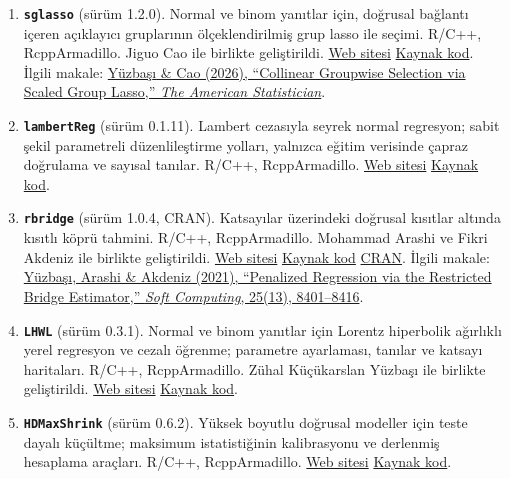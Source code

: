 \documentclass[10pt,a4paper]{article}
\newenvironment{etaremune}{\begin{enumerate}}{\end{enumerate}}
\begin{document}
\begin{etaremune}
\item \textbf{\texttt{sglasso}} (sürüm 1.2.0). Normal ve binom yanıtlar için, doğrusal bağlantı içeren açıklayıcı gruplarının ölçeklendirilmiş grup lasso ile seçimi. R/C++, RcppArmadillo. Jiguo Cao ile birlikte geliştirildi. \href{https://byuzbasi.github.io/sglasso/}{Web sitesi} \textbar{} \href{https://github.com/byuzbasi/sglasso}{Kaynak kod}. İlgili makale: \href{https://doi.org/10.1080/00031305.2026.2709494}{Y\"{u}zba\c{s}{\i} \& Cao (2026), ``Collinear Groupwise Selection via Scaled Group Lasso,'' \textit{The American Statistician}}.

\item \textbf{\texttt{lambertReg}} (sürüm 0.1.11). Lambert cezasıyla seyrek normal regresyon; sabit şekil parametreli düzenlileştirme yolları, yalnızca eğitim verisinde çapraz doğrulama ve sayısal tanılar. R/C++, RcppArmadillo. \href{https://byuzbasi.github.io/lambertReg/}{Web sitesi} \textbar{} \href{https://github.com/byuzbasi/lambertReg}{Kaynak kod}.

\item \textbf{\texttt{rbridge}} (sürüm 1.0.4, CRAN). Katsayılar üzerindeki doğrusal kısıtlar altında kısıtlı köprü tahmini. R/C++, RcppArmadillo. Mohammad Arashi ve Fikri Akdeniz ile birlikte geliştirildi. \href{https://byuzbasi.github.io/rbridge/}{Web sitesi} \textbar{} \href{https://github.com/byuzbasi/rbridge}{Kaynak kod} \textbar{} \href{https://cran.r-project.org/package=rbridge}{CRAN}. İlgili makale: \href{https://doi.org/10.1007/s00500-021-05763-9}{Y\"{u}zba\c{s}{\i}, Arashi \& Akdeniz (2021), ``Penalized Regression via the Restricted Bridge Estimator,'' \textit{Soft Computing}, 25(13), 8401--8416}.

\item \textbf{\texttt{LHWL}} (sürüm 0.3.1). Normal ve binom yanıtlar için Lorentz hiperbolik ağırlıklı yerel regresyon ve cezalı öğrenme; parametre ayarlaması, tanılar ve katsayı haritaları. R/C++, RcppArmadillo. Zühal Küçükarslan Yüzbaşı ile birlikte geliştirildi. \href{https://byuzbasi.github.io/LHWL/}{Web sitesi} \textbar{} \href{https://github.com/byuzbasi/LHWL}{Kaynak kod}.

\item \textbf{\texttt{HDMaxShrink}} (sürüm 0.6.2). Yüksek boyutlu doğrusal modeller için teste dayalı küçültme; maksimum istatistiğinin kalibrasyonu ve derlenmiş hesaplama araçları. R/C++, RcppArmadillo. \href{https://byuzbasi.github.io/HDMaxShrink/}{Web sitesi} \textbar{} \href{https://github.com/byuzbasi/HDMaxShrink}{Kaynak kod}.


\end{etaremune}
\end{document}
